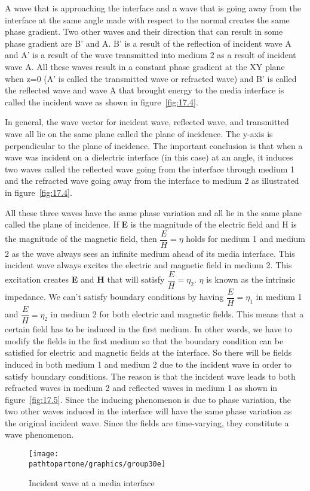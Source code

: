 A wave that is approaching the interface and a wave that is going away from the interface at the same angle made with respect to the normal creates the same phase gradient. Two other waves and their direction that can result in some phase gradient are B'
and A. B' is a result of the reflection of incident wave A and A' is a result of the wave transmitted into medium 2 as a result of incident wave A. All these waves result in a constant phase gradient at the XY plane when z=0 (A' is called the transmitted wave or refracted wave) and B' is called the reflected wave and wave A that brought energy to the media interface is called the incident wave as shown in figure~\ref{fig:17.4}.

In general, the wave vector for incident wave, reflected wave, and transmitted wave all lie on the same plane called the plane of incidence. The y-axis is perpendicular to the plane of incidence. The important conclusion is that when a wave was incident on a dielectric interface (in this case) at an angle, it induces two waves called the reflected wave going from the interface through medium 1  and the refracted wave going away from the interface to medium 2 as illustrated in figure~\ref{fig:17.4}.

All these three waves have the same phase variation and all lie in the same plane called the plane of incidence. If \textbf{E} is the magnitude of the electric field and H is the magnitude of the magnetic field, then $\dfrac{E}{H}=\eta$ holds for medium 1 and medium 2 as the wave always sees an infinite medium ahead of its media interface. This incident wave always excites the electric and magnetic field in medium 2. This excitation creates \textbf{E} and \textbf{H} that will satisfy $\dfrac{E}{H}=\eta_2$. $\eta$ is known as the intrinsic impedance. We can't satisfy boundary conditions by having $\dfrac{E}{H}=\eta_1$ in medium 1 and $\dfrac{E}{H}=\eta_2$ in medium 2 for both electric and magnetic fields. This means that a certain field has to be induced in the first medium. In other words, we have to modify the fields in the first medium so that the boundary condition can be satisfied for electric and magnetic fields at the interface. So there will be fields induced in both medium 1 and medium 2 due to the incident wave in order to satisfy boundary conditions. The reason is that the incident wave leads to both refracted waves in medium 2 and reflected waves in medium 1 as shown in figure~\ref{fig:17.5}. Since the inducing phenomenon is due to phase variation, the two other waves induced in the interface will have the same phase variation as the original incident wave. Since the fields are time-varying, they constitute a wave phenomenon.
\begin{figure}[h]
\centering
\texttt{[image: \\pathtopartone/graphics/group30e]}
\caption{Incident wave at a media interface}
\label{fig:group30e}
\end{figure}

